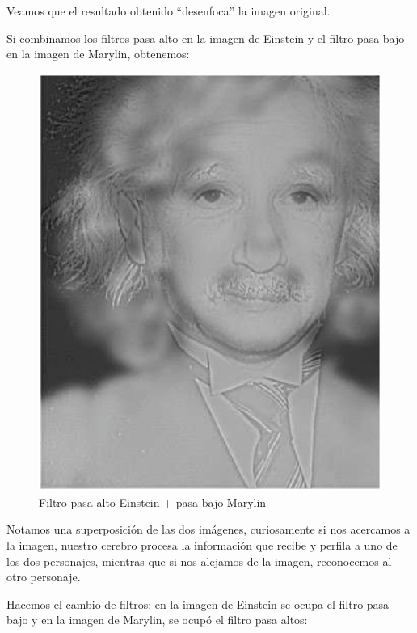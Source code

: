 \begin{figure}
\end{figure}

Veamos que el resultado obtenido \enquote{desenfoca} la imagen original.
\par
Si combinamos los filtros pasa alto en la imagen de Einstein y el filtro pasa bajo en la imagen de Marylin, obtenemos:
\begin{figure}[H]
    \centering
    \includegraphics[scale=0.35]{Imagenes/Einstein_Marylin_AB_01.eps}
    \caption{Filtro pasa alto Einstein + pasa bajo Marylin}
    \label{fig:figuraEpa_Mpb}
\end{figure}
Notamos una superposición de las dos imágenes, curiosamente si nos acercamos a la imagen, nuestro cerebro procesa la información que recibe y perfila a uno de los dos personajes, mientras que si nos alejamos de la imagen, reconocemos al otro personaje.
\par
Hacemos el cambio de filtros: en la imagen de Einstein se ocupa el filtro pasa bajo y en la imagen de Marylin, se ocupó el filtro pasa altos:
